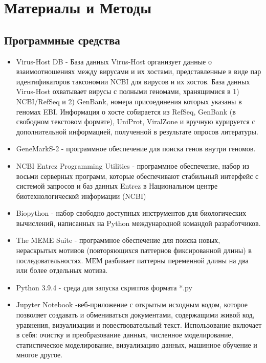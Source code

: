 \documentclass[a4paper,12pt]{article}
\begin{document}
\section{Материалы и Методы} \label{sec:code}
\subsection{Программные средства}
\begin{itemize}
    \item Virus-Host DB - База данных Virus-Host организует данные о взаимоотношениях между вирусами и их хостами,
    представленные в виде пар идентификаторов таксономии NCBI для вирусов и их хостов. База данных Virus-Host охватывает
    вирусы с полными геномами, хранящимися в 1) NCBI/RefSeq и 2) GenBank, номера присоединения которых указаны в геномах
    EBI. Информация о хосте собирается из RefSeq, GenBank (в свободном текстовом формате), UniProt, ViralZone и вручную
    курируется с дополнительной информацией, полученной в результате опросов литературы. \cite{virus-host}
    
    \item GeneMarkS-2 - программное обеспечение для поиска генов внутри геномов. \cite{lomsad}
    
    \item NCBI Entrez Programming Utilities - программное обеспечение, набор из восьми серверных программ, которые
    обеспечивают стабильный интерфейс с системой запросов и баз данных Entrez в Национальном центре биотехнологической
    информации (NCBI) \cite{entrez}
    
    \item Biopython - набор свободно доступных инструментов для биологических вычислений, написанных на Python
    международной командой разработчиков. \cite{biopython}
    
    \item The MEME Suite - программное обеспечение для поиска новых, нераскрытых мотивов (повторяющихся паттернов
    фиксированной длины) в последовательностях. МЕМ разбивает паттерны переменной длины на два или более отдельных
    мотива. \cite{bailey}
    
    \item Python 3.9.4 - среда для запуска скриптов формата *.py \cite{python}
    
    \item Jupyter Notebook -веб-приложение с открытым исходным кодом, которое позволяет создавать и обмениваться
    документами, содержащими живой код, уравнения, визуализации и повествовательный текст. Использование включает в себя:
    очистку и преобразование данных, численное моделирование, статистическое моделирование, визуализацию данных, машинное
    обучение и многое другое. \cite{jupyter}
    

\end{itemize}
\end{document}
